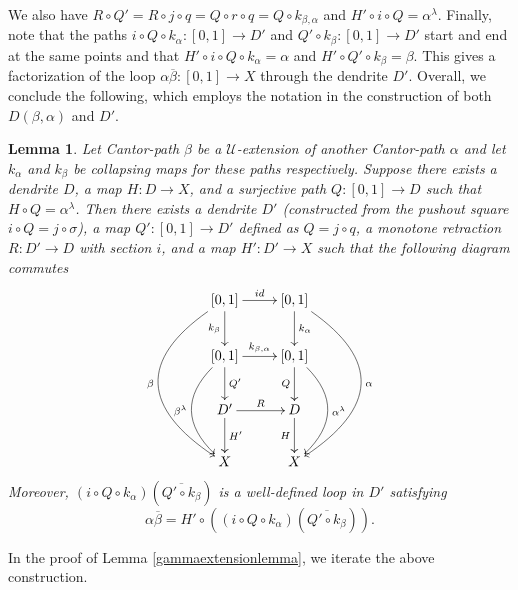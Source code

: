 \documentclass[12pt, leqno]{amsart}
\newcommand{\blue}{\color{blue}}
\newcommand{\light}{\lambda}
\newcommand{\ui}{[0,1]}
\newcommand{\scru}{\mathscr{U}}
\newcommand{\bbn}{\mathbb{N}}
\newcommand{\ov}{\overline}
\newtheorem{lemma}[theorem]{Lemma}
\theoremstyle{definition}\newtheorem{definition}[theorem]{Definition}
\begin{document}



We also have $R\circ Q'=R\circ j\circ q=Q\circ r\circ q=Q\circ k_{\beta,\alpha}$ and $H'\circ i\circ Q=\alpha^{\light}$. Finally, note that the paths $i\circ Q\circ k_{\alpha}:\ui\to D'$ and $Q'\circ k_{\beta}:\ui\to D'$ start and end at the same points and that $H'\circ i\circ Q\circ k_{\alpha}=\alpha$ and $H'\circ Q'\circ k_{\beta}=\beta$. This gives a factorization of the loop $\alpha\ov{\beta}:\ui\to X$ through the dendrite $D'$. Overall, we conclude the following, which employs the notation in the construction of both $D(\beta,\alpha)$ and $D'$.

\begin{lemma}\label{iterationlemma}
Let Cantor-path $\beta$ be a $\scru$-extension of another Cantor-path $\alpha$ and let $k_{\alpha}$ and $k_{\beta}$ be collapsing maps for these paths respectively. Suppose there exists a dendrite $D$, a map $H:D\to X$, and a surjective path $Q:\ui\to D$ such that $H\circ Q= \alpha^{\light}$. Then there exists a dendrite $D'$ (constructed from the pushout square $i\circ Q=j\circ \sigma$), a map $Q':\ui\to D'$ defined as $Q=j\circ q$, a monotone retraction $R:D'\to D$ with section $i$, and a map $H':D'\to X$ such that the following diagram commutes
\[\xymatrix{
\ui \ar@/_4pc/[ddd]_-{\beta} \ar[d]_-{k_{\beta}} \ar[r]^-{id} & \ui \ar[d]^-{k_{\alpha}} \ar@/^4pc/[ddd]^-{\alpha} \\
\ui \ar@/_2pc/[dd]_-{\beta^{\light}} \ar[d]^-{Q'} \ar[r]^-{k_{\beta,\alpha}} & \ui \ar[d]_-{Q}  \ar@/^2pc/[dd]^-{\alpha^{\light}}\\
D' \ar[d]^-{H'} \ar[r]^-{R} & D \ar[d]_-{H}\\
X & X
}\]
Moreover, $(i\circ Q\circ k_{\alpha}) (\ov{Q'\circ k_{\beta}})$ is a well-defined loop in $D'$ satisfying \[\alpha\ov{\beta}=H'\circ ((i\circ Q\circ k_{\alpha}) (\ov{Q'\circ k_{\beta}})).\]
\end{lemma}

In the proof of Lemma \ref{gammaextensionlemma}, we iterate the above construction. 

\end{document}
